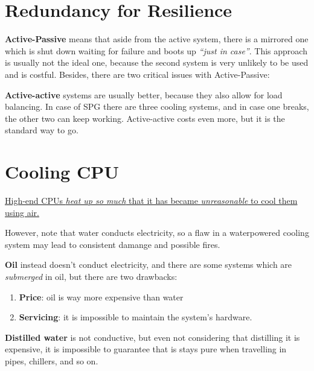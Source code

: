 \section{Redundancy for Resilience}
\textbf{Active-Passive} means that aside from the active system, there is a mirrored one which is shut down waiting for failure and boots up \textit{``just in case''}.
This approach is usually not the ideal one, because the second system is very unlikely to be used and is costful.
Besides, there are two critical issues with Active-Passive:

\textbf{Active-active} systems are usually better, because they also allow for load balancing. In case of SPG there are three cooling systems, and in case one breaks, the other two can keep working.
Active-active costs even more, but it is the standard way to go.

\section{Cooling CPU}
\begin{center}
   \ul{High-end CPUs \textit{heat up so much} that it has became \textit{unreasonable} to cool them using air.}
\end{center}

However, note that water conducts electricity, so a flaw in a waterpowered cooling system may lead to consistent damange and possible fires.

\textbf{Oil} instead doesn't conduct electricity, and there are some systems which are \textit{submerged} in oil, but there are two drawbacks:
\begin{enumerate}
   \item \textbf{Price}: oil is way more expensive than water
   \item \textbf{Servicing}: it is impossible to maintain the system's hardware.
\end{enumerate}

\textbf{Distilled water} is not conductive, but even not considering that distilling it is expensive, it is impossible to guarantee that is stays pure when travelling in pipes, chillers, and so on.

